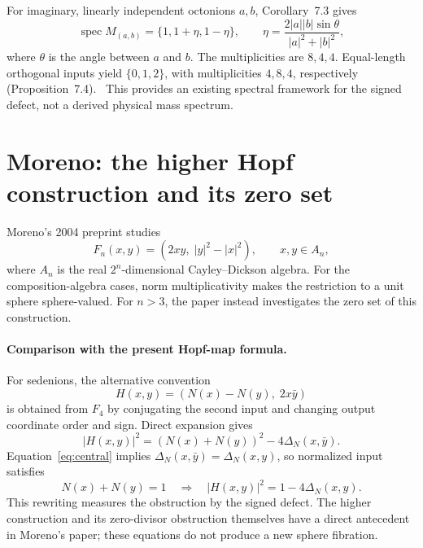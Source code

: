 \documentclass[11pt,a4paper]{article}
\newcommand{\DN}{\Delta_N}
\DeclareMathOperator{\spec}{spec}
\numberwithin{equation}{section}
\begin{document}
For imaginary, linearly independent octonions $a,b$, Corollary~7.3 gives
\begin{equation}
 \spec M_{(a,b)}=\{1,1+\eta,1-\eta\},\qquad
 \eta=\frac{2|a||b|\sin\theta}{|a|^2+|b|^2},
 \label{eq:spectrum}
\end{equation}
where $\theta$ is the angle between $a$ and $b$. The multiplicities are
$8,4,4$. Equal-length orthogonal inputs yield
$\{0,1,2\}$, with multiplicities $4,8,4$, respectively
(Proposition~7.4).~\citep[Corollary~7.3 and Proposition~7.4]{BissEtAl2009Eigentheory}
This provides an existing spectral framework for the signed defect, not
a derived physical mass spectrum.

\section{Moreno: the higher Hopf construction and its zero set}

Moreno's 2004 preprint studies
\begin{equation}
 F_n(x,y)=(2xy,\;|y|^2-|x|^2),
 \qquad x,y\in A_n,
 \label{eq:hopf-moreno}
\end{equation}
where $A_n$ is the real $2^n$-dimensional Cayley--Dickson algebra.
For the composition-algebra cases, norm multiplicativity makes the
restriction to a unit sphere sphere-valued. For $n>3$, the paper instead
investigates the zero set of this construction.~\citep[Abstract and Introduction]{Moreno2004Hopf}

\paragraph{Comparison with the present Hopf-map formula.}
For sedenions, the alternative convention
\begin{equation}
 H(x,y)=(N(x)-N(y),\;2x\bar y)
\end{equation}
is obtained from $F_4$ by conjugating the second input and changing output
coordinate order and sign. Direct expansion gives
\begin{equation}
 |H(x,y)|^2=(N(x)+N(y))^2-4\DN(x,\bar y).
\end{equation}
Equation~\eqref{eq:central} implies
$\DN(x,\bar y)=\DN(x,y)$, so normalized input satisfies
\begin{equation}
 N(x)+N(y)=1
 \quad\Longrightarrow\quad
 |H(x,y)|^2=1-4\DN(x,y).
\end{equation}
This rewriting measures the obstruction by the signed defect.
The higher construction and its zero-divisor obstruction themselves
have a direct antecedent in Moreno's paper; these equations do not
produce a new sphere fibration.
\end{document}
